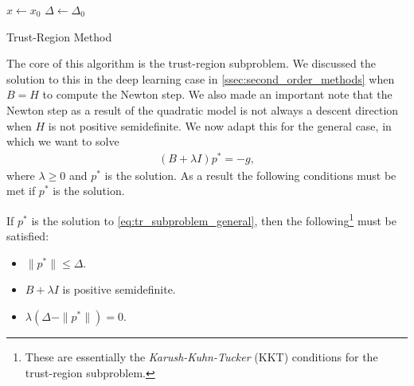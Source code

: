 \begin{algorithm}[H]
    \DontPrintSemicolon
    $x \leftarrow x_0$\;
    $\Delta \leftarrow \Delta_0$\;
    \caption{Trust-Region Method}
    \label{alg:trust_region_algorithm}
\end{algorithm}

The core of this algorithm is the trust-region subproblem. We discussed the solution to this in the deep learning case in \cref{ssec:second_order_methods} when $B = H$ to compute the Newton step. We also made an important note that the Newton step as a result of the quadratic model is not always a descent direction when $H$ is not positive semidefinite. We now adapt this for the general case, in which we want to solve
\begin{align}
    (B + \lambda I) p^* = -g,
    \label{eq:tr_subproblem_general}
\end{align}
where $\lambda \geq 0$ and $p^*$ is the solution. As a result the following conditions must be met if $p^*$ is the solution.

\begin{definition}
    If $p^*$ is the solution to \cref{eq:tr_subproblem_general}, then the following\footnote{These are essentially the \textit{Karush-Kuhn-Tucker} (KKT) conditions for the trust-region subproblem.} must be satisfied:
    \begin{itemize}
        \item $\|p^*\| \leq \Delta$.
        \item $B + \lambda I$ is positive semidefinite.
        \item $\lambda (\Delta - \|p^*\|) = 0$.
    \end{itemize}
    \label{definition:tr_subproblem_conditions}
\end{definition}

